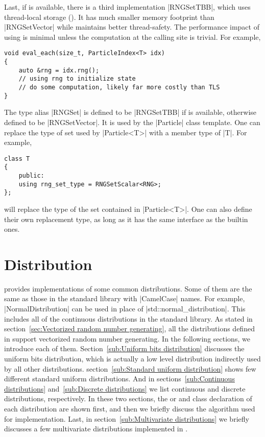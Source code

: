 Last, if \tbb is available, there is a third implementation |RNGSetTBB|, which
uses thread-local storage (\tls). It has much smaller memory footprint than
|RNGSetVector| while maintains better thread-safety. The performance impact of
using \tls is minimal unless the computation at the calling site is trivial.
For example,
\begin{Verbatim}
void eval_each(size_t, ParticleIndex<T> idx)
{
    auto &rng = idx.rng();
    // using rng to initialize state
    // do some computation, likely far more costly than TLS
}
\end{Verbatim}
The type alias |RNGSet| is defined to be |RNGSetTBB| if \tbb is available,
otherwise defined to be |RNGSetVector|. It is used by the |Particle| class
template. One can replace the type of \rng set used by |Particle<T>| with a
member type of |T|. For example,
\begin{Verbatim}
class T
{
    public:
    using rng_set_type = RNGSetScalar<RNG>;
};
\end{Verbatim}
will replace the type of the \rng set contained in |Particle<T>|. One can also
define their own replacement type, as long as it has the same interface as the
builtin ones.

\section{Distribution}
\label{sec:Distribution}

\mckl provides implementations of some common distributions. Some of them are
the same as those in the standard library with |CamelCase| names. For example,
|NormalDistribution| can be used in place of |std::normal_distribution|. This
includes all of the continuous distributions in the standard library. As stated
in section~\ref{sec:Vectorized random number generating}, all the distributions
defined in \mckl support vectorized random number generating. In the following
sections, we introduce each of them. Section~\ref{sub:Uniform bits
distribution} discusses the uniform bits distribution, which is actually a low
level distribution indirectly used by all other distributions.
section~\ref{sub:Standard uniform distribution} shows few different standard
uniform distributions. And in sections~\ref{sub:Continuous distributions}
and~\ref{sub:Discrete distributions} we list continuous and discrete
distributions, respectively. In these two sections, the \pdf or \pmf and class
declaration of each distribution are shown first, and then we briefly discuss
the algorithm used for implementation. Last, in section~\ref{sub:Multivariate
distributions} we briefly discusses a few multivariate distributions
implemented in \mckl.

